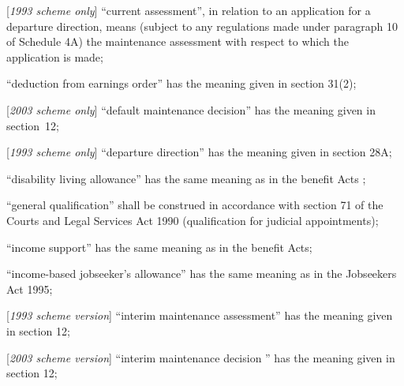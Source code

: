 \documentclass[12pt,a4paper]{article}
\begin{document}
\begin{enumerate}

     “current assessment”, in relation to an application for a departure direction, means (subject to any regulations made under paragraph 10 of Schedule 4A) the maintenance assessment with respect to which the application is made;

    “deduction from earnings order” has the meaning given in section 31(2);

[\emph{2003 scheme only}] “default maintenance decision” has the meaning given in section~12;

[\emph{1993 scheme only}]     “departure direction” has the meaning given in section 28A;

    “disability living allowance” has the same meaning as in the 
benefit Acts%
;


    “general qualification” shall be construed in accordance with section 71 of the Courts and Legal Services Act 1990 (qualification for judicial appointments);

    “income support” has the same meaning as in the benefit Acts;

“income-based jobseeker’s allowance” has the same meaning as in the Jobseekers Act 1995;

    [\emph{1993 scheme version}] “interim maintenance assessment” has the meaning given in section 12;

    [\emph{2003 scheme version}] “interim maintenance 
decision%
” has the meaning given in section 12;


\end{enumerate}
\end{document}
